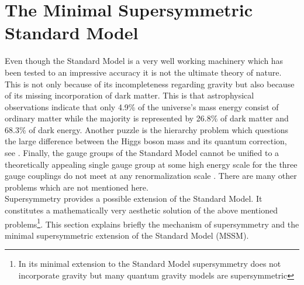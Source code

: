 \section{The Minimal Supersymmetric Standard Model}
Even though the Standard Model is a very well working machinery which has been tested to an impressive accuracy it is not the ultimate theory of nature. This is not only because of its incompleteness regarding gravity but also because of its missing incorporation of dark matter. This is that astrophysical observations \cite{Adam:2015rua} indicate that only 4.9\% of the universe's mass energy consist of ordinary matter while the majority is represented by 26.8\% of dark matter and 68.3\% of dark energy. Another puzzle is the hierarchy problem which questions the large difference between the Higgs boson mass and its quantum correction, see \cite{Martin:1997ns}. Finally, the gauge groups of the Standard Model cannot be unified to a theoretically appealing single gauge group at some high energy scale for the three gauge couplings do not meet at any renormalization scale \cite{Martin:1997ns}. There are many other problems which are not mentioned here\cite{Bach}.\\
Supersymmetry provides a possible extension of the Standard Model. It constitutes a mathematically very aesthetic solution of the above mentioned problems\footnote{In its minimal extension to the Standard Model supersymmetry does not incorporate gravity but many quantum gravity models are supersymmetric}. This section explains briefly the mechanism of supersymmetry and the minimal supersymmetric extension of the Standard Model (MSSM).

